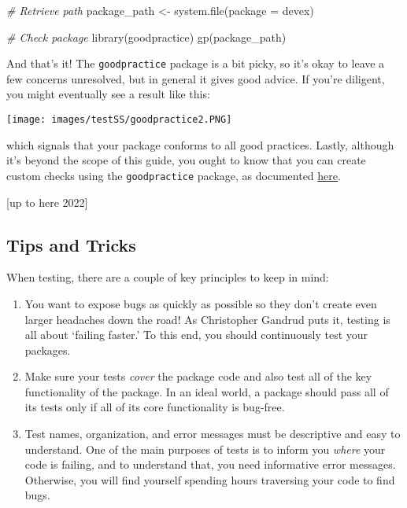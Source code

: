 \documentclass[
]{book}
\newenvironment{Shaded}{\begin{snugshade}}{\end{snugshade}}
\newcommand{\AttributeTok}[1]{\textcolor[rgb]{0.77,0.63,0.00}{#1}}
\newcommand{\CommentTok}[1]{\textcolor[rgb]{0.56,0.35,0.01}{\textit{#1}}}
\newcommand{\FunctionTok}[1]{\textcolor[rgb]{0.00,0.00,0.00}{#1}}
\newcommand{\NormalTok}[1]{#1}
\newcommand{\OtherTok}[1]{\textcolor[rgb]{0.56,0.35,0.01}{#1}}
\newcommand{\StringTok}[1]{\textcolor[rgb]{0.31,0.60,0.02}{#1}}
\providecommand{\tightlist}{%
  \setlength{\itemsep}{0pt}\setlength{\parskip}{0pt}}
\begin{document}
\begin{Shaded}
\begin{Highlighting}[]
\CommentTok{\# Retrieve path}
\NormalTok{package\_path }\OtherTok{\textless{}{-}} \FunctionTok{system.file}\NormalTok{(}\AttributeTok{package =} \StringTok{\textquotesingle{}devex\textquotesingle{}}\NormalTok{)}

\CommentTok{\# Check package}
\FunctionTok{library}\NormalTok{(goodpractice)}
\FunctionTok{gp}\NormalTok{(package\_path)}
\end{Highlighting}
\end{Shaded}

And that's it! The \texttt{goodpractice} package is a bit picky, so it's okay to leave a few concerns unresolved, but in general it gives good advice. If you're diligent, you might eventually see a result like this:

\texttt{[image: images/testSS/goodpractice2.PNG]}

which signals that your package conforms to all good practices. Lastly, although it's beyond the scope of this guide, you ought to know that you can create custom checks using the \texttt{goodpractice} package, as documented \href{https://github.com/MangoTheCat/goodpractice/blob/master/vignettes/custom_checks.Rmd}{here}.

{[}up to here 2022{]}

\hypertarget{tips-and-tricks}{%
\subsection{Tips and Tricks}\label{tips-and-tricks}}

When testing, there are a couple of key principles to keep in mind:

\begin{enumerate}
\def\labelenumi{\arabic{enumi}.}
\tightlist
\item
  You want to expose bugs as quickly as possible so they don't create even larger headaches down the road! As Christopher Gandrud puts it, testing is all about `failing faster.' To this end, you should continuously test your packages.
\item
  Make sure your tests \emph{cover} the package code and also test all of the key functionality of the package. In an ideal world, a package should pass all of its tests only if all of its core functionality is bug-free.
\item
  Test names, organization, and error messages must be descriptive and easy to understand. One of the main purposes of tests is to inform you \emph{where} your code is failing, and to understand that, you need informative error messages. Otherwise, you will find yourself spending hours traversing your code to find bugs.
\end{enumerate}
\end{document}
